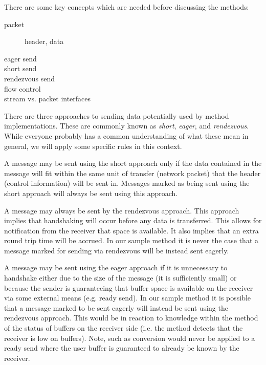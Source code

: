 \documentclass[11pt,letterpaper]{article}
\begin{document}

There are some key concepts which are needed before discussing the methods:
\begin{description}
\item[packet] header, data
\item[eager send]
\item[short send]
\item[rendezvous send]
\item[flow control]
\item[stream vs. packet interfaces]
\end{description}

There are three approaches to sending data potentially used by method
implementations.  These are commonly known as \emph{short}, \emph{eager}, and
\emph{rendezvous}.  While everyone probably has a common understanding of what
these mean in general, we will apply some specific rules in this context.

A message may be sent using the short approach only if the data contained in
the message will fit within the same unit of transfer (network packet) that the
header (control information) will be sent in.  Messages marked as being sent
using the short approach will always be sent using this approach.

A message may always be sent by the rendezvous approach.  This approach implies
that handshaking will occur before any data is transferred.  This allows for
notification from the receiver that space is available.  It also implies that
an extra round trip time will be accrued.  In our sample method it is never the
case that a message marked for sending via rendezvous will be instead sent
eagerly.


A message may be sent using the eager approach if it is unnecessary to
handshake either due to the size of the message (it is sufficiently small) or
because the sender is guaranteeing that buffer space is available on the
receiver via some external means (e.g. ready send).  In our sample method it is
possible that a message marked to be sent eagerly will instead be sent using
the rendezvous approach.  This would be in reaction to knowledge within the
method of the status of buffers on the receiver side (i.e. the method detects
that the receiver is low on buffers).  Note, such as conversion would never be
applied to a ready send where the user buffer is guaranteed to already be known
by the receiver.
\end{document}
